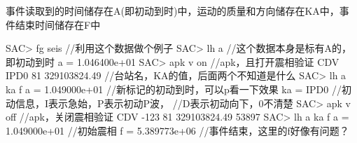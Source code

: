 事件读取到的时间储存在A(即初动到时)中，运动的质量和方向储存在KA中，事件结束时间储存在F中

\begin{SACCode}
SAC> fg seis                //利用这个数据做个例子
SAC> lh a                   //这个数据本身是标有A的，即初动到时
     a = 1.046400e+01
SAC> apk v on               //apk，且打开震相验证
 CDV IPD0 81 329103824.49   //台站名，KA的值，后面两个不知道是什么
SAC> lh a ka f
      a = 1.049000e+01      //新标记的初动到时，可以p看一下效果
     ka = IPD0              //初动信息，I表示急始，P表示初动P波，
                            //D表示初动向下，0不清楚
SAC> apk v off              //apk，关闭震相验证
 CDV -123 81 329103824.49   53897
SAC> lh a ka f
     a = 1.049000e+01       //初始震相
     f = 5.389773e+06       //事件结束，这里的f好像有问题？
\end{SACCode}
